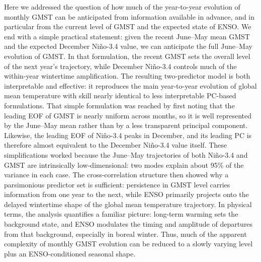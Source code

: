 \documentclass[draft]{agujournal2019}
\begin{document}
Here we addressed the question of how much of the year-to-year
  evolution of monthly GMST can be anticipated from
  information available in advance, and in particular from the current
  level of GMST and the expected state of ENSO. We end with a simple practical statement: given the recent
  June--May mean GMST and the expected December
  Niño-3.4 value, we can anticipate the full June--May evolution of
  GMST. In that formulation, the recent GMST sets the
  overall level of the next year's trajectory, while December
  Niño-3.4 controls much of the within-year wintertime amplification. The resulting two-predictor model is both interpretable and
  effective: it reproduces the main year-to-year evolution of global
  mean temperature with skill nearly identical to less interpretable
  PC-based formulations. That simple formulation was reached by first noting that the
  leading EOF of GMST is nearly uniform across
  months, so it is well represented by the June--May mean rather than
  by a less transparent principal component. Likewise, the leading EOF of Niño-3.4 peaks in December, and its
  leading PC is therefore almost equivalent to the December Niño-3.4
  value itself. These simplifications worked because the June--May trajectories
  of both Niño-3.4 and GMST are intrinsically
  low-dimensional: two modes explain about 95\% of the variance in
  each case. The cross-correlation structure then showed why a parsimonious
  predictor set is sufficient: persistence in GMST
  level carries information from one year to the next, while ENSO
  primarily projects onto the delayed wintertime shape of the global
  mean temperature trajectory. In physical terms, the analysis quantifies a familiar picture:
  long-term warming sets the background state, and ENSO modulates the
  timing and amplitude of departures from that background, especially
  in boreal winter. Thus, much of the apparent complexity of monthly GMST evolution
  can be reduced to a slowly varying level plus an ENSO-conditioned
  seasonal shape.
\end{document}
